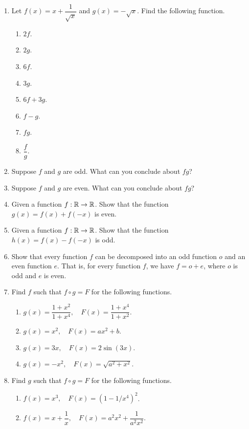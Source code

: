 \documentclass[11pt]{book}
\begin{document}
\begin{enumerate}[label=\arabic*.]
    \item Let $f(x)=x+\dfrac{1}{\sqrt{x}}$ and $g(x)=-\sqrt{x}$. Find the following function.
    \begin{multicols}{4}
        \begin{enumerate}
            \item $2f$.
            \item $2g$.
            \item $6f$.
            \item $3g$.
            \item $6f+3g$.
            \item $f-g$.
            \item $fg$.
            \item $\dfrac{f}{g}$.
        \end{enumerate}
    \end{multicols}
    \item Suppose $f$ and $g$ are odd. What can you conclude about $fg$?
    \item Suppose $f$ and $g$ are even. What can you conclude about $fg$?
    \item Given a function $f:\mathbb{R}\to\mathbb{R}$. Show that the function $g(x)=f(x)+f(-x)$ is even.
    \item Given a function $f:\mathbb{R}\to\mathbb{R}$. Show that the function $h(x)=f(x)-f(-x)$ is odd.
    \item Show that every function $f$ can be decomposed into an odd function $o$ and an even function $e$. That is, for every function $f$, we have $f=o+e$, where $o$ is odd and $e$ is even.
    \item Find $f$ such that $f\circ g=F$ for the following functions.
    \begin{enumerate}
        \item $g(x)=\dfrac{1+x^2}{1+x^4}, \quad F(x)=\dfrac{1+x^4}{1+x^2}$.
        \item $g(x)=x^2, \quad F(x)=ax^2+b$.
        \item $g(x)=3x, \quad F(x)=2\sin(3x)$.
        \item $g(x)=-x^2, \quad F(x)=\sqrt{a^2+x^2}$.
    \end{enumerate}
    \item Find $g$ such that $f\circ g=F$ for the following functions.
    \begin{enumerate}
        \item $f(x)=x^3, \quad F(x)=(1-1/x^4)^2$.
        \item $f(x)=x+\dfrac{1}{x}, \quad F(x)=a^2x^2+\dfrac{1}{a^2x^2}$.

\end{enumerate}
\end{enumerate}
\end{document}
